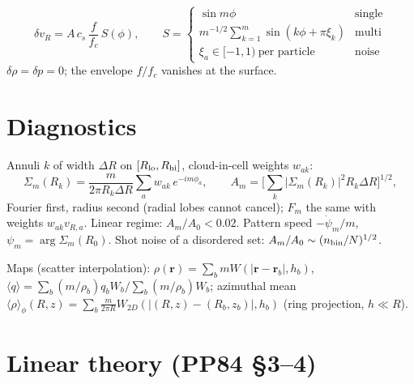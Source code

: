 \documentclass[10pt,a4paper]{article}
\newcommand{\vr}{\mathbf{r}}
\begin{document}
\begin{equation}
\delta v_R=A\,c_s\,\frac{f}{f_c}\,S(\phi),\qquad
S=\begin{cases}\sin m\phi&\text{single}\\
m^{-1/2}\sum_{k=1}^m\sin(k\phi+\pi\xi_k)&\text{multi}\\
\xi_a\in[-1,1)\ \text{per particle}&\text{noise}\end{cases}
\end{equation}
$\delta\rho=\delta p=0$; the envelope $f/f_c$ vanishes at the surface.

\section{Diagnostics}

Annuli $k$ of width $\Delta R$ on $[R_{\rm lo},R_{\rm hi}]$, cloud-in-cell weights $w_{ak}$:
\begin{equation}
\Sigma_m(R_k)=\frac{m}{2\pi R_k\Delta R}\sum_a w_{ak}\,e^{-im\phi_a},\qquad
A_m=\Big[\sum_k|\Sigma_m(R_k)|^2R_k\Delta R\Big]^{1/2},
\end{equation}
Fourier first, radius second (radial lobes cannot cancel); $F_m$ the same with weights
$w_{ak}v_{R,a}$. Linear regime: $A_m/A_0<0.02$. Pattern speed $-\dot\psi_m/m$,
$\psi_m=\arg\Sigma_m(R_0)$. Shot noise of a disordered set: $A_m/A_0\sim(n_{\rm bin}/N)^{1/2}$.

Maps (scatter interpolation): $\rho(\vr)=\sum_bmW(|\vr-\vr_b|,h_b)$,
$\langle q\rangle=\sum_b(m/\rho_b)q_bW_b/\sum_b(m/\rho_b)W_b$; azimuthal mean
$\langle\rho\rangle_\phi(R,z)=\sum_b\frac{m}{2\pi R}W_{2D}(|(R,z)-(R_b,z_b)|,h_b)$ (ring
projection, $h\ll R$).

\section{Linear theory (PP84 \S3--4)}
\end{document}
